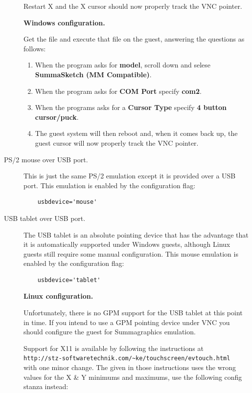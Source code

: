 \documentclass[11pt,twoside,final,openright]{report}
\begin{document}
\begin{description}
Restart X and the X cursor should now properly
track the VNC pointer.


\textbf{Windows configuration.}

Get the file
and execute that file on the guest,
answering the questions as follows:

\begin{enumerate}
\item When the program asks for \textbf{model},
scroll down and selese \textbf{SummaSketch (MM Compatible)}.

\item When the program asks for \textbf{COM Port} specify \textbf{com2}.

\item When the programs asks for a \textbf{Cursor Type} specify
\textbf{4 button cursor/puck}.

\item The guest system will then reboot and,
when it comes back up,
the guest cursor will now properly track
the VNC pointer.
\end{enumerate}

\item[PS/2 mouse over USB port.]
This is just the same PS/2 emulation except it is
provided over a USB port.
This emulation is enabled by the configuration flag:
{\small
\begin{verbatim}
    usbdevice='mouse'
\end{verbatim}
}

\item[USB tablet over USB port.]
The USB tablet is an absolute pointing device
that has the advantage that it is automatically
supported under Windows guests,
although Linux guests still require some
manual configuration.
This mouse emulation is enabled by the
configuration flag:
{\small
\begin{verbatim}
    usbdevice='tablet'
\end{verbatim}
}

\textbf{Linux configuration.}

Unfortunately,
there is no GPM support for the
USB tablet at this point in time.
If you intend to use a GPM pointing
device under VNC you should
configure the guest for Summagraphics
emulation.

Support for X11 is available by following
the instructions at\\
\verb+http://stz-softwaretechnik.com/~ke/touchscreen/evtouch.html+\\
with one minor change.
The
given in those instructions
uses the wrong values for the X \& Y minimums and maximums,
use the following config stanza instead:


\end{description}
\end{document}
